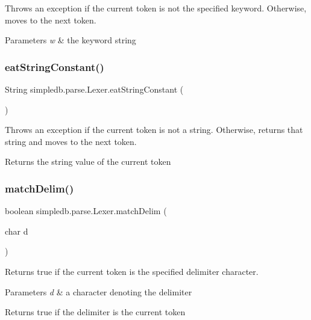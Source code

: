 Throws an exception if the current token is not the specified keyword. Otherwise, moves to the next token. 
\begin{DoxyParams}{Parameters}
{\em w} & the keyword string \\
\hline
\end{DoxyParams}
\mbox{\label{classsimpledb_1_1parse_1_1Lexer_a85a2a94288c68eadfaf8e48c5824bea8}} 
\subsubsection{\texorpdfstring{eat\+String\+Constant()}{eatStringConstant()}}
{\footnotesize\ttfamily String simpledb.\+parse.\+Lexer.\+eat\+String\+Constant (\begin{DoxyParamCaption}{ }\end{DoxyParamCaption})\hspace{0.3cm}{\ttfamily [inline]}}

Throws an exception if the current token is not a string. Otherwise, returns that string and moves to the next token. \begin{DoxyReturn}{Returns}
the string value of the current token 
\end{DoxyReturn}
\mbox{\label{classsimpledb_1_1parse_1_1Lexer_ab63b0b6fbda48cb0523fcb2c83d3a514}} 
\subsubsection{\texorpdfstring{match\+Delim()}{matchDelim()}}
{\footnotesize\ttfamily boolean simpledb.\+parse.\+Lexer.\+match\+Delim (\begin{DoxyParamCaption}\item[{char}]{d }\end{DoxyParamCaption})\hspace{0.3cm}{\ttfamily [inline]}}

Returns true if the current token is the specified delimiter character. 
\begin{DoxyParams}{Parameters}
{\em d} & a character denoting the delimiter \\
\hline
\end{DoxyParams}
\begin{DoxyReturn}{Returns}
true if the delimiter is the current token 
\end{DoxyReturn}
\mbox{\label{classsimpledb_1_1parse_1_1Lexer_afce0043bfddfa1503110faace1e0ba5b}} 
